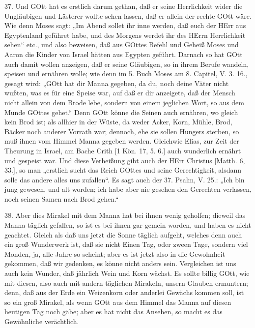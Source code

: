 37. Und GOtt hat es erstlich darum gethan, daß er seine Herrlichkeit wider die Ungläubigen und Lästerer wollte sehen lassen, daß er allein der rechte GOtt wäre. Wie denn Moses sagt: „Im Abend sollet ihr inne werden, daß euch der HErr aus Egyptenland geführet habe, und des Morgens werdet ihr des HErrn Herrlichkeit sehen“ etc., und also beweisen, daß aus GOttes Befehl und Geheiß Moses und Aaron die Kinder von Israel hätten aus Egypten geführt. Darnach so hat GOtt auch damit wollen anzeigen, daß er seine Gläubigen, so in ihrem Berufe wandeln, speisen und ernähren wolle; wie denn im 5. Buch Moses am 8. Capitel, V. 3. 16., gesagt wird: „GOtt hat dir Manna gegeben, da du, noch deine Väter nicht wußten, was es für eine Speise war, auf daß er dir anzeigete, daß der Mensch nicht allein von dem Brode lebe, sondern von einem jeglichen Wort, so aus dem Munde GOttes gehet.“ Denn GOtt könne die Seinen auch ernähren, wo gleich kein Brod ist; als allhier in der Wüste, da weder Acker, Korn, Mühle, Brod, Bäcker noch anderer Vorrath war; dennoch, ehe sie sollen Hungers sterben, so muß ihnen vom Himmel Manna gegeben werden. Gleichwie Elias, zur Zeit der Theurung in Israel, am Bache Crith [1 Kön. 17, 5. 6.] auch wunderlich ernährt und gespeist war. Und diese Verheißung gibt auch der HErr Christus [Matth. 6, 33.], so man „erstlich sucht das Reich GOttes und seine Gerechtigkeit, alsdann solle das andere alles uns zufallen“. Es sagt auch der 37. Psalm, V. 25.: „Ich bin jung gewesen, und alt worden; ich habe aber nie gesehen den Gerechten verlassen, noch seinen Samen nach Brod gehen.“

38. Aber dies Mirakel mit dem Manna hat bei ihnen wenig geholfen; dieweil das Manna täglich gefallen, so ist es bei ihnen gar gemein worden, und haben es nicht geachtet. Gleich als daß uns jetzt die Sonne täglich aufgeht, welches denn auch ein groß Wunderwerk ist, daß sie nicht Einen Tag, oder zween Tage, sondern viel Monden, ja, alle Jahre so scheint; aber es ist jetzt also in die Gewohnheit gekommen, daß wir gedenken, es könne nicht anders sein. Vergleichen ist uns auch kein Wunder, daß jährlich Wein und Korn wächst. Es sollte billig GOtt, wie mit diesen, also auch mit andern täglichen Mirakeln, unsern Glauben ermuntern; denn, daß aus der Erde ein Weizenkorn oder anderlei Gewächs kommen soll, ist so ein groß Mirakel, als wenn GOtt aus dem Himmel das Manna auf diesen heutigen Tag noch gäbe; aber es hat nicht das Ansehen, so macht es das Gewöhnliche verächtlich.

